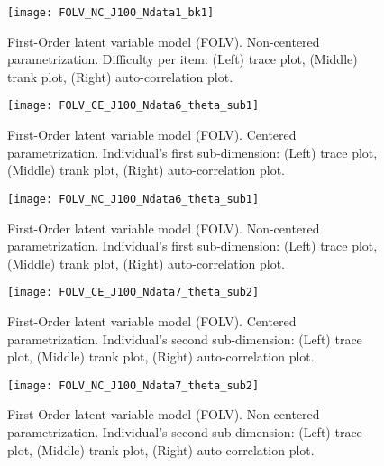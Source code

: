 %
\begin{figure}[H]
	\centering
	\texttt{[image: FOLV\_NC\_J100\_Ndata1\_bk1]}
	\caption[First-Order latent variable model (FOLV). Non-centered parametrization. Difficulty per item. Trace, trank and auto-correlation plots.]%
	{First-Order latent variable model (FOLV). Non-centered parametrization. Difficulty per item: (Left) trace plot, (Middle) trank plot, (Right) auto-correlation plot.}
	\label{fig:FOLV_NC_chains3}
\end{figure}
%
\begin{figure}[H]
	\centering
	\texttt{[image: FOLV\_CE\_J100\_Ndata6\_theta\_sub1]}
	\caption[First-Order latent variable model (FOLV). Centered parametrization. Individual's first sub-dimension. Trace, trank and auto-correlation plots.]%
	{First-Order latent variable model (FOLV). Centered parametrization. Individual's first sub-dimension: (Left) trace plot, (Middle) trank plot, (Right) auto-correlation plot.}
	\label{fig:FOLV_CE_chains4}
\end{figure}
%
\begin{figure}[H]
	\centering
	\texttt{[image: FOLV\_NC\_J100\_Ndata6\_theta\_sub1]}
	\caption[First-Order latent variable model (FOLV). Non-centered parametrization. Individual's first sub-dimension. Trace, trank and auto-correlation plots.]%
	{First-Order latent variable model (FOLV). Non-centered parametrization. Individual's first sub-dimension: (Left) trace plot, (Middle) trank plot, (Right) auto-correlation plot.}
	\label{fig:FOLV_NC_chains4}
\end{figure}
%
\begin{figure}[H]
	\centering
	\texttt{[image: FOLV\_CE\_J100\_Ndata7\_theta\_sub2]}
	\caption[First-Order latent variable model (FOLV). Centered parametrization. Individual's second sub-dimension. Trace, trank and auto-correlation plots.]%
	{First-Order latent variable model (FOLV). Centered parametrization. Individual's second sub-dimension: (Left) trace plot, (Middle) trank plot, (Right) auto-correlation plot.}
	\label{fig:FOLV_CE_chains5}
\end{figure}
%
\begin{figure}[H]
	\centering
	\texttt{[image: FOLV\_NC\_J100\_Ndata7\_theta\_sub2]}
	\caption[First-Order latent variable model (FOLV). Non-centered parametrization. Individual's second sub-dimension. Trace, trank and auto-correlation plots.]%
	{First-Order latent variable model (FOLV). Non-centered parametrization. Individual's second sub-dimension: (Left) trace plot, (Middle) trank plot, (Right) auto-correlation plot.}
	\label{fig:FOLV_NC_chains5}
\end{figure}
